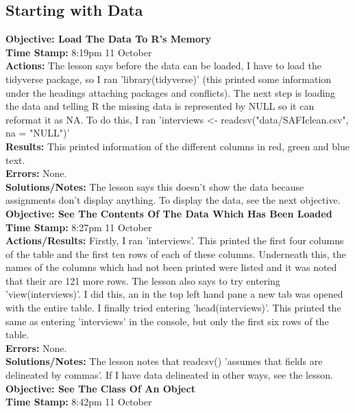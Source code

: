 \documentclass{article}
\begin{document}
\begin{FlushLeft}
\subsection{Starting with Data}
\textbf{Objective: Load The Data To R's Memory}\\ 
\textbf{Time Stamp:} 8:19pm 11 October\\
\textbf{Actions:} The lesson says before the data can be loaded, I have to load the tidyverse package, so I ran 'library(tidyverse)' (this printed some information under the headings attaching packages and conflicts). The next step is loading the data and telling R the missing data is represented by NULL so it can reformat it as NA. To do this, I ran 'interviews \textless - read\textunderscore csv("data/SAFI\textunderscore clean.csv", na = "NULL")' \\
\textbf{Results:} This printed information of the different columns in red, green and blue text.\\
\textbf{Errors:} None.\\
\textbf{Solutions/Notes:} The lesson says this doesn't show the data because assignments don't display anything. To display the data, see the next objective.\\
\vspace{5mm}
\textbf{Objective: See The Contents Of The Data Which Has Been Loaded}\\ 
\textbf{Time Stamp:} 8:27pm 11 October\\
\textbf{Actions/Results:} Firstly, I ran 'interviews'. This printed the first four columns of the table and the first ten rows of each of these columns. Underneath this, the names of the columns which had not been printed were listed and it was noted that their are 121 more rows. The lesson also says to try entering \\'view(interviews)'. I did this, an in the top left hand pane a new tab was opened with the entire table. I finally tried entering 'head(interviews)'. This printed the same as entering 'interviews' in the console, but only the first six rows of the table.\\
\textbf{Errors:} None.\\
\textbf{Solutions/Notes:} The lesson notes that read\textunderscore csv() 'assumes that fields are delineated by commas'. If I have data delineated in other ways, see the lesson.\\
\vspace{5mm}
\textbf{Objective: See The Class Of An Object}\\ 
\textbf{Time Stamp:} 8:42pm 11 October\\

\end{FlushLeft}
\end{document}
